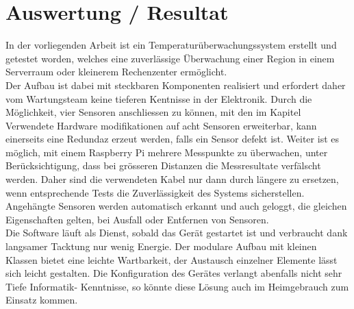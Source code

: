 \section{Auswertung / Resultat}
In der vorliegenden Arbeit ist ein Temperaturüberwachungssystem erstellt und getestet worden, welches eine zuverlässige Überwachung einer Region in einem Serverraum oder kleinerem Rechenzenter ermöglicht.\\
Der Aufbau ist dabei mit steckbaren Komponenten realisiert und erfordert daher vom Wartungsteam keine tieferen Kentnisse in der Elektronik. Durch die Möglichkeit, vier Sensoren anschliessen zu können, mit den im Kapitel \glqq{}Verwendete Hardware\grqq{} modifikationen auf acht Sensoren erweiterbar, kann einerseits eine Redundaz erzeut werden, falls ein Sensor defekt ist. Weiter ist es möglich, mit einem Raspberry Pi mehrere Messpunkte zu überwachen, unter Berücksichtigung, dass bei grösseren Distanzen die Messresultate verfälscht werden. Daher sind die verwendeten Kabel nur dann durch längere zu ersetzen, wenn entsprechende Tests die Zuverlässigkeit des Systems sicherstellen. Angehängte Sensoren werden automatisch erkannt und auch geloggt, die gleichen Eigenschaften gelten, bei Ausfall oder Entfernen von Sensoren.\\
Die Software läuft als Dienst, sobald das Gerät gestartet ist und verbraucht dank langsamer Tacktung nur wenig Energie. Der modulare Aufbau mit kleinen Klassen bietet eine leichte Wartbarkeit, der Austausch einzelner Elemente lässt sich leicht gestalten. Die Konfiguration des Gerätes verlangt abenfalls nicht sehr Tiefe Informatik- Kenntnisse, so könnte diese Lösung auch im Heimgebrauch zum Einsatz kommen.
\newpage